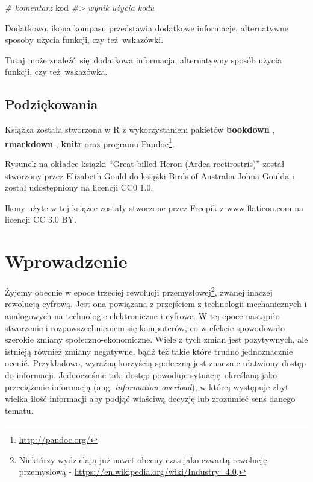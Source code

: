 \documentclass[paper=6in:9in,pagesize=pdftex,headinclude=on,footinclude=on,10pt]{scrbook}
\newenvironment{Shaded}{\begin{snugshade}}{\end{snugshade}}
\newcommand{\CommentTok}[1]{\textcolor[rgb]{0.56,0.35,0.01}{\textit{#1}}}
\newcommand{\NormalTok}[1]{#1}
\DeclareRobustCommand{\href}[2]{#2\footnote{\url{#1}}}
\let\BeginKnitrBlock\begin \let\EndKnitrBlock\end
\begin{document}
\begin{Shaded}
\begin{Highlighting}[]
\CommentTok{# komentarz}
\NormalTok{kod}
\CommentTok{#> wynik użycia kodu}
\end{Highlighting}
\end{Shaded}

Dodatkowo, ikona kompasu przedstawia dodatkowe informacje, alternatywne sposoby użycia funkcji, czy też~wskazówki.

\BeginKnitrBlock{rmdinfo}
Tutaj może znaleźć~się~dodatkowa informacja, alternatywny sposób użycia funkcji, czy też~wskazówka.
\EndKnitrBlock{rmdinfo}

\hypertarget{podziux119kowania}{%
\section*{Podziękowania}\label{podziux119kowania}}

Książka została stworzona w R \citep{R-base} z wykorzystaniem pakietów \textbf{bookdown} \citep{R-bookdown}, \textbf{rmarkdown} \citep{R-rmarkdown}, \textbf{knitr} \citep{R-knitr} oraz programu \href{http://pandoc.org/}{Pandoc}.

Rysunek na okładce książki ``Great-billed Heron (Ardea rectirostris)'' został stworzony przez Elizabeth Gould do książki Birds of Australia Johna Goulda i został udostępniony na licencji CC0 1.0.

Ikony użyte w tej książce zostały stworzone przez Freepik z www.flaticon.com na licencji CC 3.0 BY.

\hypertarget{wprowadzenie}{%
\chapter{Wprowadzenie}\label{wprowadzenie}}

Żyjemy obecnie w epoce trzeciej rewolucji przemysłowej\footnote{Niektórzy wydzielają już nawet obecny czas jako czwartą rewolucję przemysłową - \url{https://en.wikipedia.org/wiki/Industry_4.0}.}, zwanej inaczej rewolucją cyfrową.
Jest ona powiązana z przejściem z technologii mechanicznych i analogowych na technologie elektroniczne i cyfrowe.
W tej epoce nastąpiło stworzenie i rozpowszechnieniem się komputerów, co w efekcie spowodowało szerokie zmiany społeczno-ekonomiczne.
Wiele z tych zmian jest pozytywnych, ale istnieją również zmiany negatywne, bądź też takie które trudno jednoznacznie ocenić.
Przykładowo, wyraźną korzyścią społeczną jest znacznie ułatwiony dostęp do informacji.
Jednocześnie taki dostęp powoduje sytuację~określaną jako przeciążenie informacją (ang. \emph{information overload}), w której występuje zbyt wielka ilość informacji aby podjąć właściwą decyzję lub zrozumieć sens danego tematu.
\end{document}
